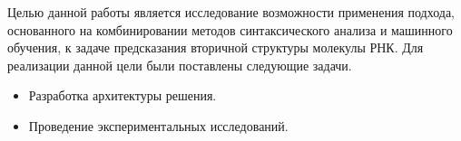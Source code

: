 Целью данной работы является исследование возможности применения подхода, основанного на комбинировании методов синтаксического анализа и машинного обучения, к задаче предсказания вторичной структуры молекулы РНК. Для реализации данной цели были поставлены следующие задачи.
\begin{itemize}
    \item Разработка архитектуры решения.
    \item Проведение экспериментальных исследований.
\end{itemize}